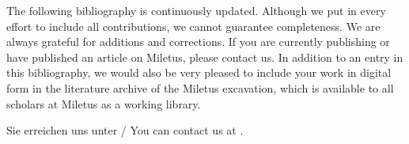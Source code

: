 The following bibliography is continuously updated. Although we put in every effort to include all contributions, we cannot guarantee completeness. We are always grateful for additions and corrections. If you are currently publishing or have published an article on Miletus, please contact us. In addition to an entry in this bibliography, we would also be very pleased to include your work in digital form in the literature archive of the Miletus excavation, which is available to all scholars at Miletus as a working library. 

\begin{flushleft}%
Sie erreichen uns unter / You can contact us at .
\end{flushleft}%
%
